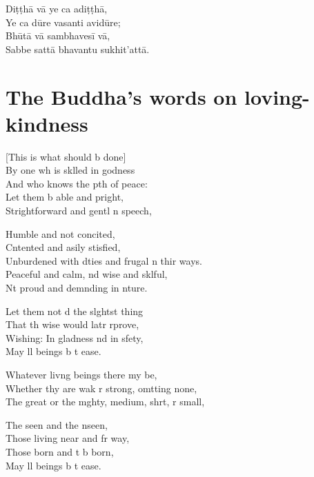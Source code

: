 Diṭṭhā vā ye ca adiṭṭhā,\\
Ye ca dūre vasanti avidūre;\\
Bhūtā vā sambhavesī vā,\\
Sabbe sattā bhavantu sukhit'attā.

\clearpage

\chapter[Loving-kindness]{The Buddha's words on loving-kindness}                                       %

\begin{leader}
\end{leader}

[This is what should b done]\\
By one wh is sklled in godness\\
And who knows the pth of peace:\\
Let them b able and pright,\\
Strightforward and gentl n speech,

Humble and not concited,\\
Cntented and asily stisfied,\\
Unburdened with dties and frugal n thir ways.\\
Peaceful and calm, nd wise and sklful,\\
Nt proud and demnding in nture.

Let them not d the slghtst thing\\
That th wise would latr rprove,\\
Wishing: In gladness nd in sfety,\\
May ll beings b t ease.

Whatever livng beings there my be,\\
Whether thy are wak r strong, omtting none,\\
The great or the mghty, medium, shrt, r small,

The seen and the nseen,\\
Those living near and fr way,\\
Those born and t b born,\\
May ll beings b t ease.

